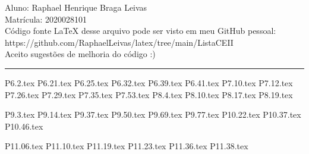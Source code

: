 \documentclass[12pt]{scrartcl}
\begin{document}
\pagestyle{fancy}

\fancyhead{}
\fancyfoot{}

\begin{center}
    Aluno: Raphael Henrique Braga Leivas \\
    Matrícula: 2020028101 \\[20pt]
    Código fonte LaTeX desse arquivo pode ser visto em meu GitHub pessoal: \\
    https://github.com/RaphaelLeivas/latex/tree/main/ListaCEII \\
    Aceito sugestões de melhoria do código :)
\end{center}

\hrule

{P6.2.tex}
{P6.21.tex}
{P6.25.tex}
{P6.32.tex}
{P6.39.tex}
{P6.41.tex}
{P7.10.tex}
{P7.12.tex}
{P7.26.tex}
{P7.29.tex}
{P7.35.tex}
{P7.53.tex}
{P8.4.tex}
{P8.10.tex}
{P8.17.tex}
{P8.19.tex}

{P9.3.tex}
{P9.14.tex}
{P9.37.tex}
{P9.50.tex}
{P9.69.tex}
{P9.77.tex}
{P10.22.tex}
{P10.37.tex}
{P10.46.tex}

{P11.06.tex}
{P11.10.tex}
{P11.19.tex}
{P11.23.tex}
{P11.36.tex}
{P11.38.tex}
\end{document}
